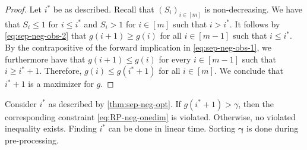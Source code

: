 \begin{proof}
    Let $i^*$ be as described.
    Recall that $(S_i)_{i \in [m]}$ is non-decreasing.
    We have that $S_i \leq 1$ for $i \leq i^*$ and $S_i > 1$ for $i \in [m]$ such that $i > i^*$.
    It follows by \eqref{eq:sep-neg-obs-2} that $g(i+1) \geq g(i)$ for all $i \in [m-1]$ such that $i \leq i^{*}.$
    By the contrapositive of the forward implication in \eqref{eq:sep-neg-obs-1}, we furthermore have that
    $g(i+1) \leq g(i)$ for every $i \in [m-1]$ such that $i \geq i^*+1$.
    Therefore, $g(i) \leq g(i^*+1)$ for all $i \in [m]$.
    We conclude that $i^*+1$ is a maximizer for $g$.
\end{proof}
Consider $i^*$ as described by \autoref{thm:sep-neg-opt}.
If $g(i^*+1) > \gamma$, then the corresponding constraint \eqref{eq:RP-neg-onedim} is violated.
Otherwise, no violated inequality exists.
Finding $i^*$ can be done in linear time.
Sorting $\bm{\gamma}$ is done during pre-processing.